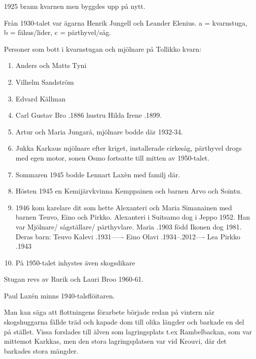 1925 brann kvarnen men byggdes upp på nytt.

Från 1930-talet var ägarna Henrik Jungell och Leander Elenius.
a = kvarnstuga, b = fähus/lider, c = pärthyvel/såg.

Personer som bott i kvarnstugan och mjölnare på Tollikko kvarn:
\begin{enumerate}
  \item Anders och Matts Tyni
  \item Vilhelm Sandström
  \item Edvard Källman
  \item Carl Gustav Bro .1886 hustru Hilda Irene .1899.
  \item Artur och Maria Jungarå, mjölnare bodde där 1932-34.
  \item Jukka Karkaus mjölnare efter kriget, installerade cirkesåg, pärthyvel drogs med egen motor, sonen Osmo fortsatte till mitten av 1950-talet.
  \item Sommaren 1945 bodde Lennart Laxèn med familj där.
  \item Hösten 1945 en Kemijärvkvinna Kemppainen och barnen Arvo och Sointu.
  \item 1946 kom karelare dit som hette Alexanteri och Maria Simanainen med barnen Teuvo, Eino och Pirkko.
  Alexanteri  i Suitsamo dog i Jeppo 1952. Han var Mjölnare/ sågställare/ pärthyvlare.
  Maria .1903 född Ikonen dog 1981. Deras barn: Teuvo Kalevi .1931------ Eino Olavi .1934--.2012---- Lea Pirkko .1943
  \item På 1950-talet inhystes även skogsdikare
\end{enumerate}
Stugan revs av Rurik och Lauri Broo 1960-61.



Paul Laxén  minns 1940-talsflöitaren.

Man kan säga att flottningens förarbete började redan på vintern när skogshuggarna fällde träd och kapade dom till olika längder och barkade en del på stället. Vissa forslades till älven som lagringsplats t.ex Rambelbackan, som var mittemot Karkkas, men den stora lagringsplatsen var vid Krouvi, där det barkades stora mängder.

